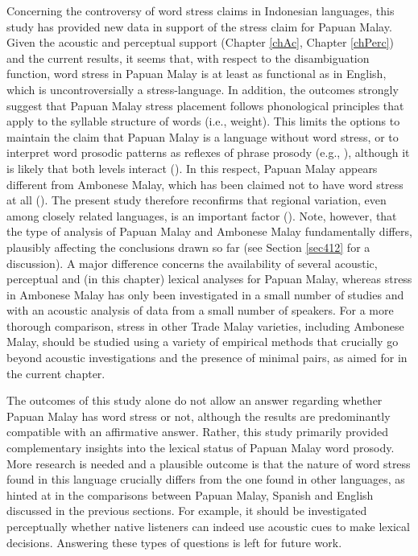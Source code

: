 Concerning the controversy of word stress claims in Indonesian languages, this study has provided new data in support of the stress claim for Papuan Malay. Given the acoustic and perceptual support (Chapter \ref{chAc}, Chapter \ref{chPerc}) and the current results, it seems that, with respect to the disambiguation function, word stress in Papuan Malay is at least as functional as in English, which is uncontroversially a stress-language. In addition, the outcomes strongly suggest that Papuan Malay stress placement follows phonological principles that apply to the syllable structure of words (i.e., weight). This limits the options to maintain the claim that Papuan Malay is a language without word stress, or to interpret word prosodic patterns as reflexes of phrase prosody (e.g., \citealt{vanzanten_stress_2010}), although it is likely that both levels interact (\citealt{kaland_demarcating_2020}). In this respect, Papuan Malay appears different from Ambonese Malay, which has been claimed not to have word stress at all (\citealt{maskikit-essed_no_2016}). The present study therefore reconfirms that regional variation, even among closely related languages, is an important factor (\citealt{goedemans_stress_2007}). Note, however, that the type of analysis of Papuan Malay and Ambonese Malay fundamentally differs, plausibly affecting the conclusions drawn so far (see Section \ref{sec412} for a discussion). A major difference concerns the availability of several acoustic, perceptual and (in this chapter) lexical analyses for Papuan Malay, whereas stress in Ambonese Malay has only been investigated in a small number of studies and with an acoustic analysis of data from a small number of speakers. For a more thorough comparison, stress in other Trade Malay varieties, including Ambonese Malay, should be studied using a variety of empirical methods that crucially go beyond acoustic investigations and the presence of minimal pairs, as aimed for in the current chapter.\par

The outcomes of this study alone do not allow an answer regarding whether Papuan Malay has word stress or not, although the results are predominantly compatible with an affirmative answer. Rather, this study primarily provided complementary insights into the lexical status of Papuan Malay word prosody. More research is needed and a plausible outcome is that the nature of word stress found in this language crucially differs from the one found in other languages, as hinted at in the comparisons between Papuan Malay, Spanish and English discussed in the previous sections. For example, it should be investigated perceptually whether native listeners can indeed use acoustic cues to make lexical decisions. Answering these types of questions is left for future work.
